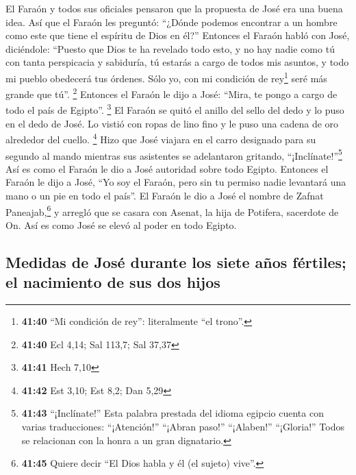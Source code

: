  El Faraón y todos sus oficiales pensaron que la
propuesta de José era una buena idea.  Así que el Faraón
les preguntó: ``¿Dónde podemos encontrar a un hombre como este que tiene
el espíritu de Dios en él?''  Entonces el Faraón habló
con José, diciéndole: ``Puesto que Dios te ha revelado todo esto, y no
hay nadie como tú con tanta perspicacia y sabiduría,  tú
estarás a cargo de todos mis asuntos, y todo mi pueblo obedecerá tus
órdenes. Sólo yo, con mi condición de rey\footnote{\textbf{41:40} ``Mi
  condición de rey'': literalmente ``el trono''.} seré más grande que
tú''. \footnote{\textbf{41:40} Ecl 4,14; Sal 113,7; Sal 37,37}
 Entonces el Faraón le dijo a José: ``Mira, te pongo a
cargo de todo el país de Egipto''. \footnote{\textbf{41:41} Hech 7,10}
 El Faraón se quitó el anillo del sello del dedo y lo
puso en el dedo de José. Lo vistió con ropas de lino fino y le puso una
cadena de oro alrededor del cuello. \footnote{\textbf{41:42} Est 3,10;
  Est 8,2; Dan 5,29}  Hizo que José viajara en el carro
designado para su segundo al mando mientras sus asistentes se
adelantaron gritando, ``¡Inclínate!''\footnote{\textbf{41:43}
  ``¡Inclínate!'' Esta palabra prestada del idioma egipcio cuenta con
  varias traducciones: ``¡Atención!'' ``¡Abran paso!'' ``¡Alaben!''
  ``¡Gloria!'' Todos se relacionan con la honra a un gran dignatario.}
Así es como el Faraón le dio a José autoridad sobre todo Egipto.
 Entonces el Faraón le dijo a José, ``Yo soy el Faraón,
pero sin tu permiso nadie levantará una mano o un pie en todo el país''.
 El Faraón le dio a José el nombre de Zafnat
Paneajab,\footnote{\textbf{41:45} Quiere decir ``El Dios habla y él (el
  sujeto) vive''.} y arregló que se casara con Asenat, la hija de
Potifera, sacerdote de On. Así es como José se elevó al poder en todo
Egipto.

\hypertarget{medidas-de-josuxe9-durante-los-siete-auxf1os-fuxe9rtiles-el-nacimiento-de-sus-dos-hijos}{%
\subsection{Medidas de José durante los siete años fértiles; el
nacimiento de sus dos
hijos}\label{medidas-de-josuxe9-durante-los-siete-auxf1os-fuxe9rtiles-el-nacimiento-de-sus-dos-hijos}}

